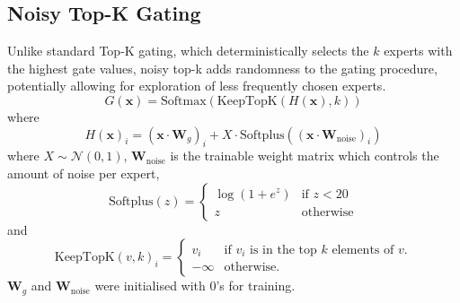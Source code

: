 \documentclass[12pt]{article}
\begin{document}
\subsection{Noisy Top-K Gating}
Unlike standard Top-K gating, which deterministically selects the $k$ experts with the highest gate values, noisy top-k adds randomness to the gating procedure, potentially allowing for exploration of less frequently chosen experts.
\begin{equation}
G(\mathbf{x}) = \text{Softmax}(\text{KeepTopK}(H(\mathbf{x}), k))
\end{equation}
where
\begin{equation}
H(\mathbf{x})_i = (\mathbf{x} \cdot \mathbf{W}_g)_i + X \cdot \text{Softplus}((\mathbf{x} \cdot \mathbf{W}_{\text{noise}})_i)
\end{equation}
where $X\sim \mathcal{N}(0,1)$, $\mathbf{W}_{\text{noise}}$ is the trainable weight matrix which controls the amount of noise per expert,
\begin{equation}
\text{Softplus}(z) = 
\begin{cases} 
\log(1 + e^{z}) & \text{if } z < 20 \\
z & \text{otherwise}
\end{cases}
\end{equation}
and 
\begin{equation}
\text{KeepTopK}(v, k)_i = 
\begin{cases} 
v_i & \text{if } v_i \text{ is in the top } k \text{ elements of } v. \\
-\infty & \text{otherwise}.
\end{cases}
\end{equation}
$\mathbf{W}_g$ and $\mathbf{W}_{\text{noise}}$ were initialised with 0's for training.
\end{document}
